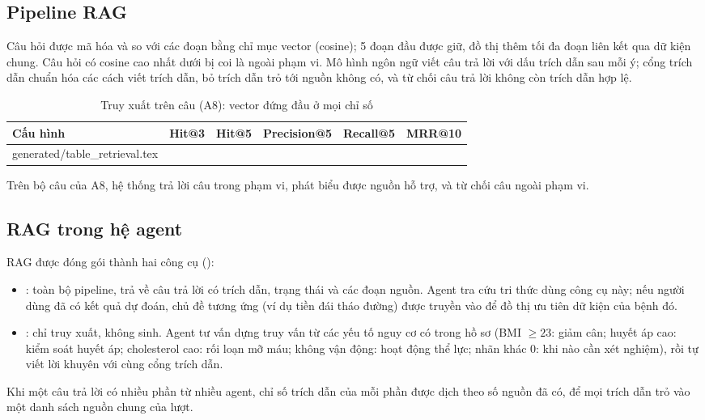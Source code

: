 \documentclass[11pt,a4paper]{article}
\makeatletter
\newcommand{\tablerows}[1]{\@@input #1 }
\makeatother
\begin{document}
\subsection{Pipeline RAG}

Câu hỏi được mã hóa và so với các đoạn bằng chỉ mục vector (cosine); 5 đoạn đầu được giữ, đồ thị thêm tối đa \expandN{}
đoạn liên kết qua dữ kiện chung. Câu hỏi có cosine cao nhất dưới \oosMin{} bị coi là ngoài phạm vi. Mô hình ngôn ngữ viết câu
trả lời với dấu trích dẫn sau mỗi ý; cổng trích dẫn chuẩn hóa các cách viết trích dẫn, bỏ trích dẫn trỏ tới nguồn không có,
và từ chối câu trả lời không còn trích dẫn hợp lệ.

\begin{table}[H]
\centering
\caption{Truy xuất trên \nInScope{} câu (A8): vector đứng đầu ở mọi chỉ số}
\begin{tabular}{lccccc}
\toprule
Cấu hình & Hit@3 & Hit@5 & Precision@5 & Recall@5 & MRR@10 \\
\midrule
\tablerows{generated/table_retrieval.tex}
\bottomrule
\end{tabular}
\end{table}

Trên bộ \nQuestions{} câu của A8, hệ thống trả lời \answeredTwo{} câu trong phạm vi, \supportedTwo{} phát biểu được nguồn hỗ
trợ, và từ chối  câu ngoài phạm vi.

\subsection{RAG trong hệ agent}

RAG được đóng gói thành hai công cụ ():
\begin{itemize}
  \item {}: toàn bộ pipeline, trả về câu trả lời có trích dẫn, trạng thái và các đoạn
        nguồn. Agent tra cứu tri thức dùng công cụ này; nếu người dùng đã có kết quả dự đoán, chủ đề tương ứng (ví dụ tiền đái
        tháo đường) được truyền vào để đồ thị ưu tiên dữ kiện của bệnh đó.
  \item {}: chỉ truy xuất, không sinh. Agent tư vấn dựng truy vấn từ các yếu tố nguy cơ
        có trong hồ sơ (BMI $\geq 23$: giảm cân; huyết áp cao: kiểm soát huyết áp; cholesterol cao: rối loạn mỡ máu; không vận
        động: hoạt động thể lực; nhãn khác 0: khi nào cần xét nghiệm), rồi tự viết lời khuyên với cùng cổng trích dẫn.
\end{itemize}
Khi một câu trả lời có nhiều phần từ nhiều agent, chỉ số trích dẫn của mỗi phần được dịch theo số nguồn đã có, để mọi trích
dẫn trỏ vào một danh sách nguồn chung của lượt.
\end{document}
